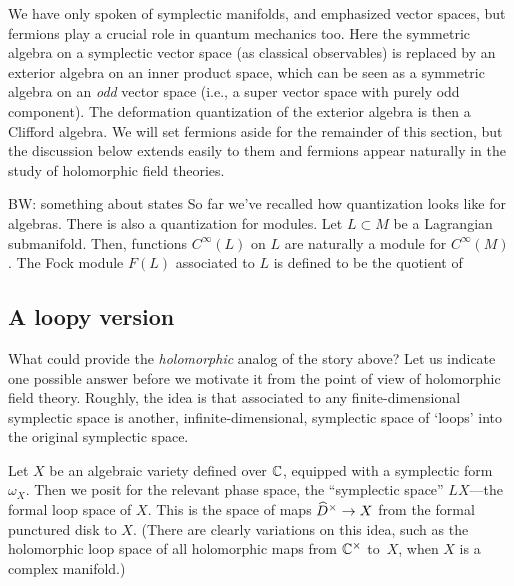 \documentclass[11pt]{amsart}
\def\brian#1{{\textcolor{blue!65!red}{BW: {#1}}}}
\def\owen#1{{\textcolor{violet!65!black}{OG: {#1}}}}
\begin{document}
\begin{rmk}
We have only spoken of symplectic manifolds, and emphasized vector spaces,
but fermions play a crucial role in quantum mechanics too.
Here the symmetric algebra on a symplectic vector space (as classical observables) 
is replaced by an exterior algebra on an inner product space,
which can be seen as a symmetric algebra on an {\em odd} vector space
(i.e., a super vector space with purely odd component).
The deformation quantization of the exterior algebra is then a Clifford algebra.
We will set fermions aside for the remainder of this section,
but the discussion below extends easily to them and fermions appear naturally in the study of holomorphic field theories.
\end{rmk}

\brian{something about states}
So far we've recalled how quantization looks like for algebras.
There is also a quantization for modules.
Let $L \subset M$ be a Lagrangian submanifold.
Then, functions $C^\infty(L)$ on $L$ are naturally a module for $C^\infty(M)$.
The Fock module $F(L)$ associated to $L$ is defined to be the quotient of 

\subsection{A loopy version}

What could provide the {\em holomorphic} analog of the story above?
Let us indicate one possible answer before we motivate it from the point of view of holomorphic field theory.
Roughly, the idea is that associated to any finite-dimensional symplectic space is another, infinite-dimensional, symplectic space of `loops' into the original symplectic space.


Let $X$ be an algebraic variety defined over $\CC$, equipped with a symplectic form $\omega_X$.
Then we posit for the relevant phase space, the ``symplectic space'' $LX$---the formal loop space of $X$.
This is the space of maps $\Hat{D}^\times \to X$ from the formal punctured disk to $X$.
%
(There are clearly variations on this idea, such as the holomorphic loop space of all holomorphic maps from $\CC^\times$ to~$X$, when $X$ is a complex manifold.)
\end{document}
